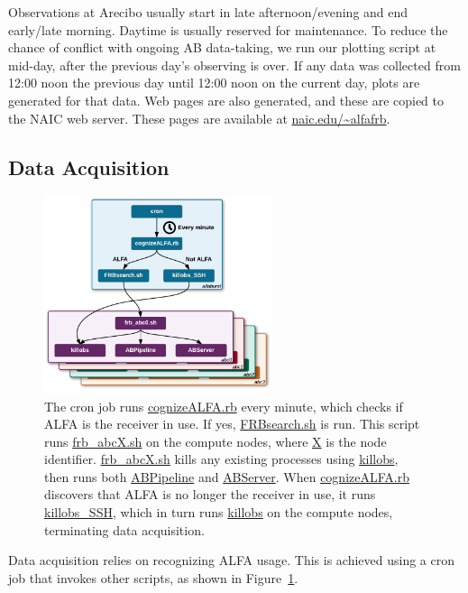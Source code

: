 \documentclass{article}
\begin{document}
Observations at Arecibo usually start in late afternoon/evening and end
early/late morning. Daytime is usually reserved for maintenance. To reduce
the chance of conflict with ongoing AB data-taking, we run our plotting script
at mid-day, after the previous day's observing is over. If any data was
collected from 12:00 noon the previous day until 12:00 noon on the current day,
plots are generated for that data. Web pages are also generated, and these are
copied to the NAIC web server. These pages are available at
\url{naic.edu/~alfafrb}.


\subsection{Data Acquisition}

\begin{figure}[h]
\begin{center}
\includegraphics[width=0.6\textwidth]{abrunstop.png}
\end{center}
\caption{The cron job runs \protect\url{cognizeALFA.rb} every minute, which
checks if ALFA is the receiver in use. If yes,
\protect\url{FRBsearch.sh} is run. This script runs \protect\url{frb_abcX.sh}
on the compute nodes, where \protect\url{X} is the node identifier.
\protect\url{frb_abcX.sh} kills any existing processes using
\protect\url{killobs}, then runs both \protect\url{ABPipeline} and
\protect\url{ABServer}. When \protect\url{cognizeALFA.rb} discovers that ALFA
is no longer the receiver in use, it runs \protect\url{killobs_SSH}, which in
turn runs \protect\url{killobs} on the compute nodes, terminating data
acquisition.\label{fig_abrunstop}}
\end{figure}

Data acquisition relies on recognizing ALFA usage. This is achieved using a
cron job that invokes other scripts, as shown in Figure~\ref{fig_abrunstop}.
\end{document}
